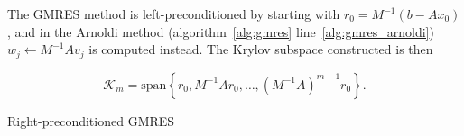 The GMRES method is left-preconditioned by starting with $r_0 = M^{-1}(b-Ax_0)$, and in the Arnoldi method (algorithm~\ref{alg:gmres} line~\ref{alg:gmres_arnoldi}) $w_j \gets M^{-1}Av_j$ is computed instead. The Krylov subspace constructed is then

\begin{equation}
    \mathcal{K}_m = \text{span}\left\{r_0, M^{-1}Ar_0, \ldots, \left(M^{-1}A\right)^{m-1}r_0\right\}.
\end{equation}

Right-preconditioned GMRES


